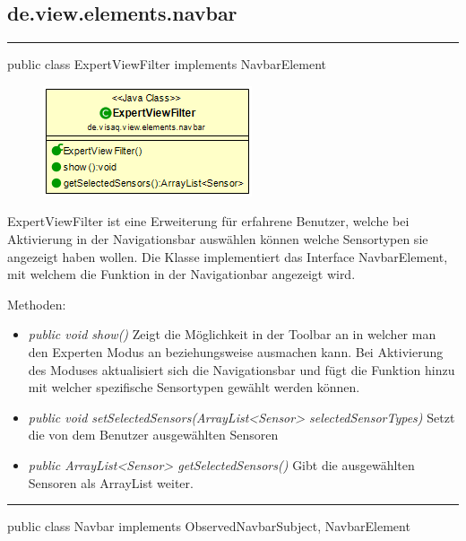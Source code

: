 \subsection{de.view.elements.navbar}

\rule{\textwidth}{0.4pt} 
public class ExpertViewFilter implements NavbarElement 

\begin{minipage}{0.3\textwidth}
    \begin{figure}[H]
        \includegraphics[scale = 0.6]{media/frontend/view/de.view.elements.navbar/ExpertviewFilterClass.png}
    \end{figure}
    \end{minipage} \hfill
    \begin{minipage}{0.6\textwidth}
ExpertViewFilter ist eine Erweiterung für erfahrene Benutzer, welche bei Aktivierung in der Navigationsbar auswählen können welche Sensortypen sie angezeigt haben wollen. Die Klasse implementiert das Interface NavbarElement, mit welchem die Funktion in der Navigationbar angezeigt wird.
\end{minipage}

Methoden:
\begin{itemize} 
    \item \emph{public void show()} Zeigt die Möglichkeit in der Toolbar an in welcher man den Experten Modus an beziehungsweise ausmachen kann. Bei Aktivierung des Moduses aktualisiert sich die Navigationsbar und fügt die Funktion hinzu mit welcher spezifische Sensortypen gewählt werden können.
    \item \emph{public void setSelectedSensors(ArrayList<Sensor> selectedSensorTypes)} Setzt die von dem Benutzer ausgewählten Sensoren
    \item \emph{public ArrayList<Sensor> getSelectedSensors()} Gibt die ausgewählten Sensoren als ArrayList weiter.
\end{itemize}

\rule{\textwidth}{0.4pt} 
public class Navbar implements ObservedNavbarSubject, NavbarElement


